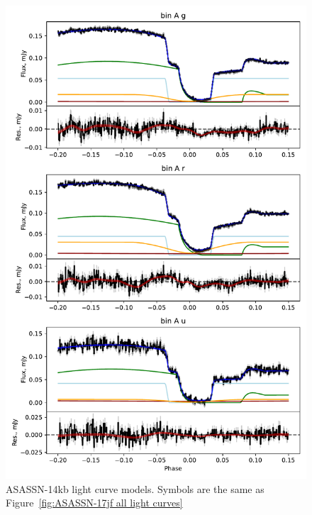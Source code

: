 \begin{figure}
    \centering
    \includegraphics[width=\textwidth]{figures/results/ASASSN-14kb/ASASSN-14kb_1.pdf}
    \caption{ASASSN-14kb light curve models. Symbols are the same as Figure~\ref{fig:ASASSN-17jf all light curves}}
    \label{fig:ASASSN-14kb all light curves}
\end{figure}
